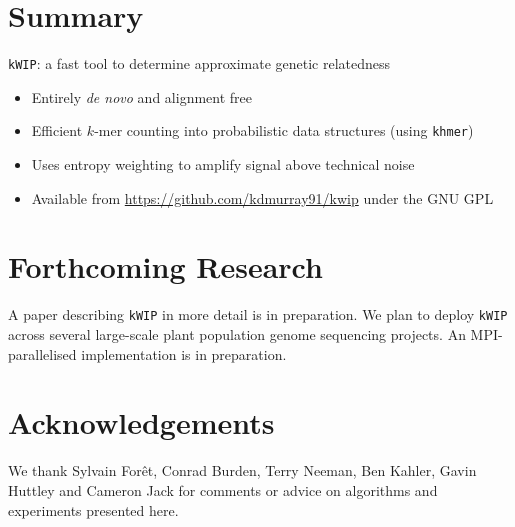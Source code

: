 \documentclass[a0,portrait]{a0poster}
\begin{document}
\begin{multicols}{2}

\color{ForestGreen}


\section*{Summary}
\Large
\texttt{kWIP}: a fast tool to determine approximate genetic relatedness
\begin{itemize}
  \item Entirely \textit{de novo} and alignment free
  \item Efficient $k$-mer counting into probabilistic data structures (using
      \texttt{khmer})
  \item Uses entropy weighting to amplify signal above technical noise
  \item Available from \url{https://github.com/kdmurray91/kwip} under the GNU GPL
\end{itemize}

\normalsize
\color{Black}


\section*{Forthcoming Research}

A paper describing \texttt{kWIP} in more detail is in preparation. We plan to
deploy \texttt{kWIP} across several large-scale plant population genome
sequencing projects. An MPI-parallelised implementation is in preparation.


\section*{Acknowledgements}

We thank Sylvain For\^{e}t, Conrad Burden, Terry Neeman, Ben Kahler, Gavin
Huttley and Cameron Jack for comments or advice on algorithms and experiments
presented here.


\tiny
\printbibliography
\normalsize

\end{multicols}
\end{document}
